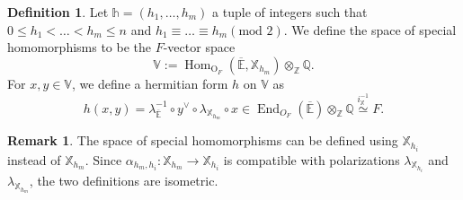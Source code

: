 \documentclass[11pt,oneside]{amsart}
\DeclareMathOperator{\Hom}{Hom}
\DeclareMathOperator{\End}{End}
\renewcommand{\O}{\mathrm{O}}
\theoremstyle{plain}
\theoremstyle{definition}
\newtheorem{definition}[theorem]{Definition}
\newtheorem{remark}[theorem]{Remark}
\theoremstyle{remark}
\newcommand{\tx}[1]{\text{#1}}
\newcommand{\BE}{{\mathbb E}}
\newcommand{\BQ}{{\mathbb Q}}
\newcommand{\BV}{{\mathbb V}}
\newcommand{\BX}{{\mathbb X}}
\newcommand{\BZ}{{\mathbb Z}}
\numberwithin{equation}{section}
\begin{document}
	
	\begin{definition}\label{definition3.3.4}
		Let $\mathds{h}=(h_1,\dots,h_m)$ a tuple of integers such that $0\leq h_1<\dots<h_m \leq n$ and $h_1 \equiv \dots \equiv h_m (\tx{mod } 2)$. We define the space of special homomorphisms to be the $F$-vector space
		\begin{equation*}
			\BV:=\Hom_{\O_F}(\overline{\BE},\BX_{h_m})\otimes_{\BZ}\BQ.
		\end{equation*}
		For $x,y \in \BV$, we define a hermitian form $h$ on $\BV$ as
		\begin{equation*}
			h(x,y)=\lambda_{\overline{\BE}}^{-1}\circ y^{\vee}\circ \lambda_{\BX_{h_m}}\circ x \in \End_{O_F}(\overline{\BE})\otimes_{\BZ}\BQ \overset{i_{\BX}^{-1}}{\simeq} F.
		\end{equation*}
	\end{definition}
	
	\begin{remark}
		The space of special homomorphisms can be defined using $\BX_{h_i}$ instead of $\BX_{h_m}$. Since $\alpha_{h_m,h_i}:\BX_{h_m} \rightarrow \BX_{h_i}$ is compatible with polarizations $\lambda_{\BX_{h_i}}$ and $\lambda_{\BX_{h_m}}$, the two definitions are isometric.
	\end{remark}
	
\end{document}
